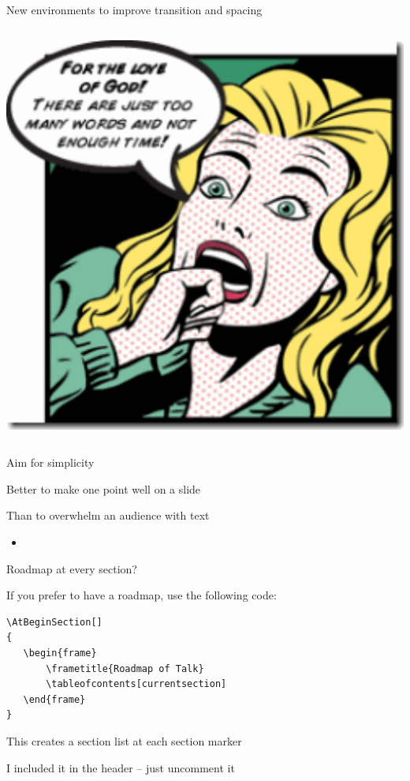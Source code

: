 \documentclass[notes,11pt, aspectratio=169]{beamer}
\newenvironment{wideitemize}{\itemize\addtolength{\itemsep}{10pt}}{\enditemize}
\begin{document}
\begin{frame}[fragile]{New environments to improve transition and spacing}
\begin{columns}[T]
\begin{column}{.28\textwidth}
{{      \includegraphics{too-many-words.pdf}
    }
  }
\end{column}%
\end{columns}
\end{frame}

\begin{frame}{Aim for simplicity}
\begin{center}
\Large Better to make one point well on a slide
\end{center}
\end{frame}

\begin{frame}{Than to overwhelm an audience with text}
  \begin{itemize}
  \item \lipsum
  \end{itemize}
\end{frame}

\begin{frame}[fragile]{Roadmap at every section?}
  \begin{wideitemize}
    \item If you prefer to have a roadmap, use the following code:
\begin{verbatim}
\AtBeginSection[]
{
   \begin{frame}
       \frametitle{Roadmap of Talk}
       \tableofcontents[currentsection]
   \end{frame}
}
\end{verbatim}
    \item This creates a section list at each section marker
    \item I included it in the header -- just uncomment it
  \end{wideitemize}
\end{frame}
\end{document}
